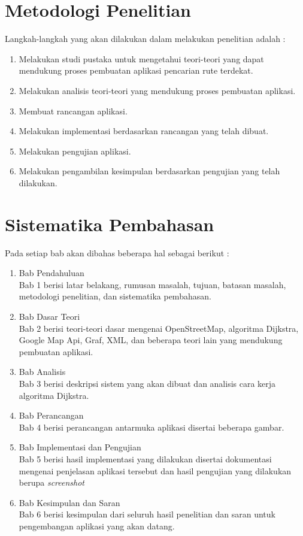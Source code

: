 \section{Metodologi Penelitian}
Langkah-langkah yang akan dilakukan dalam melakukan penelitian adalah :
\begin{enumerate}
	\item Melakukan studi pustaka untuk mengetahui teori-teori yang dapat mendukung
	proses pembuatan aplikasi pencarian rute terdekat.
	\item Melakukan analisis teori-teori yang mendukung proses pembuatan aplikasi.
	\item Membuat rancangan aplikasi.
	\item Melakukan implementasi berdasarkan rancangan yang telah dibuat.
	\item Melakukan pengujian aplikasi.
	\item Melakukan pengambilan kesimpulan berdasarkan pengujian yang telah dilakukan.
\end{enumerate}

\section{Sistematika Pembahasan}
Pada setiap bab akan dibahas beberapa hal sebagai berikut :
\begin{enumerate}
	\item Bab Pendahuluan\\
	Bab 1 berisi latar belakang, rumusan masalah, tujuan, batasan masalah, metodologi penelitian, dan sistematika pembahasan.
	
	\item Bab Dasar Teori\\
	Bab 2 berisi teori-teori dasar mengenai OpenStreetMap, algoritma Dijkstra,
	Google Map Api, Graf, XML, dan beberapa teori lain yang mendukung pembuatan
	aplikasi.
	
	\item Bab Analisis\\
	Bab 3 berisi deskripsi sistem yang akan dibuat dan analisis cara kerja
	algoritma Dijkstra.
	
	\item Bab Perancangan\\
	Bab 4 berisi perancangan antarmuka aplikasi disertai beberapa gambar.
	
	\item Bab Implementasi dan Pengujian\\
	Bab 5 berisi hasil implementasi yang dilakukan disertai dokumentasi mengenai
	penjelasan aplikasi tersebut dan hasil pengujian yang dilakukan berupa
	\textit{screenshot}
	
	\item Bab Kesimpulan dan Saran\\
	Bab 6 berisi kesimpulan dari seluruh hasil penelitian dan saran untuk
	pengembangan aplikasi yang akan datang.
\end{enumerate}